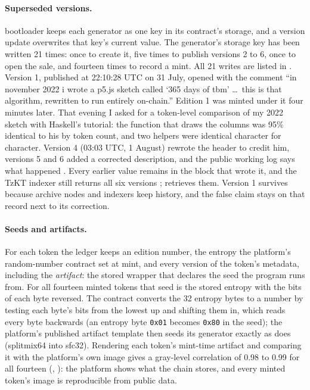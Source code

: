 \documentclass[11pt]{article}
\begin{document}
\paragraph{Superseded versions.} bootloader keeps each generator as one key in its contract's storage, and a version update overwrites that key's current value. The generator's storage key has been written 21 times: once to create it, five times to publish versions 2 to 6, once to open the sale, and fourteen times to record a mint. All 21 writes are listed in . Version 1, published at 22:10:28 UTC on 31 July, opened with the comment ``in november 2022 i wrote a p5.js sketch called `365 days of tbm' \ldots\ this is that algorithm, rewritten to run entirely on-chain.'' Edition 1 was minted under it four minutes later. That evening I asked for a token-level comparison of my 2022 sketch with Haskell's tutorial: the function that draws the columns was 95\% identical to his by token count, and two helpers were identical character for character. Version 4 (03:03 UTC, 1 August) rewrote the header to credit him, versions 5 and 6 added a corrected description, and the public working log says what happened \citep{workinglog2026}. Every earlier value remains in the block that wrote it, and the TzKT indexer still returns all six versions \citep{tzkt};  retrieves them. Version 1 survives because archive nodes and indexers keep history, and the false claim stays on that record next to its correction.

\paragraph{Seeds and artifacts.} For each token the ledger keeps an edition number, the entropy the platform's random-number contract set at mint, and every version of the token's metadata, including the \emph{artifact}: the stored wrapper that declares the seed the program runs from. For all fourteen minted tokens that seed is the stored entropy with the bits of each byte reversed. The contract converts the 32 entropy bytes to a number by testing each byte's bits from the lowest up and shifting them in, which reads every byte backwards (an entropy byte \texttt{0x01} becomes \texttt{0x80} in the seed); the platform's published artifact template then seeds its generator exactly as  does (splitmix64 into sfc32). Rendering each token's mint-time artifact and comparing it with the platform's own image gives a gray-level correlation of 0.98 to 0.99 for all fourteen (, ): the platform shows what the chain stores, and every minted token's image is reproducible from public data.
\end{document}

